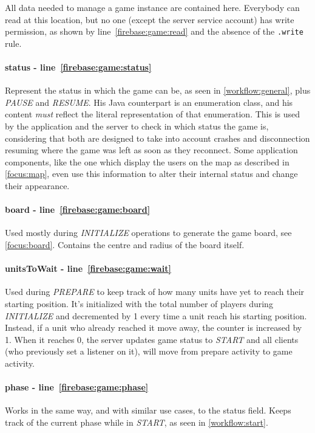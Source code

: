 				All data needed to manage a game instance are contained here.
				Everybody can read at this location, but no one (except the server service account) has write permission, as shown by line~\ref{firebase:game:read} and the absence of the \lstinline|.write| rule. \\
				
				\paragraph{status - line~\ref{firebase:game:status}}
				Represent the status in which the game can be, as seen in \autoref{workflow:general}, plus \emph{PAUSE} and \emph{RESUME}.
				His Java counterpart is an enumeration class, and his content \emph{must} reflect the literal representation of that enumeration.
				This is used by the application and the server to check in which status the game is, considering that both are designed to take into account crashes and disconnection resuming where the game was left as soon as they reconnect.
				Some application components, like the one which display the users on the map as described in \autoref{focus:map}, even use this information to alter their internal status and change their appearance.
				
				\paragraph{board - line~\ref{firebase:game:board}}
				Used mostly during \emph{INITIALIZE} operations to generate the game board, see \autoref{focus:board}.
				Contains the centre and radius of the board itself.
				
				\paragraph{unitsToWait - line~\ref{firebase:game:wait}}
				Used during \emph{PREPARE} to keep track of how many units have yet to reach their starting position.
				It's initialized with the total number of players during \emph{INITIALIZE} and decremented by 1 every time a unit reach his starting position.
				Instead, if a unit who already reached it move away, the counter is increased by 1.
				When it reaches 0, the server updates game status to \emph{START} and all clients (who previously set a listener on it), will move from prepare activity to game activity.
				
				\paragraph{phase - line~\ref{firebase:game:phase}}
				Works in the same way, and with similar use cases, to the status field.
				Keeps track of the current phase while in \emph{START}, as seen in \autoref{workflow:start}.
				
